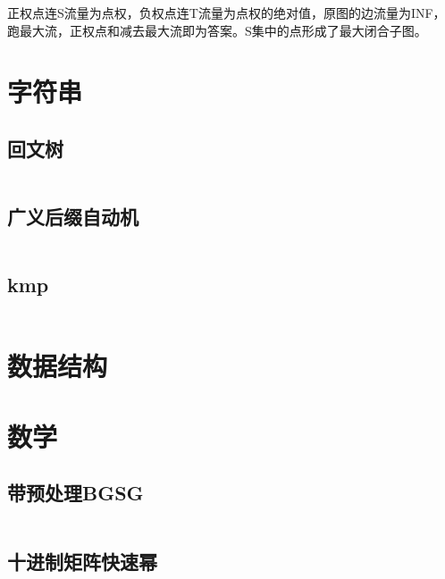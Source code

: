 \documentclass[a4paper,11pt]{article}
\begin{document}
	正权点连S流量为点权，负权点连T流量为点权的绝对值，原图的边流量为INF，跑最大流，正权点和减去最大流即为答案。S集中的点形成了最大闭合子图。






    \newpage
    \section{字符串}

    \subsection{回文树}
    \inputminted[breaklines]{c++}{String/pam.cpp}

    \subsection{广义后缀自动机}
    \inputminted[breaklines]{c++}{String/sam.cpp}

    \subsection{kmp}
    \inputminted[breaklines]{c++}{String/kmp.cpp}


    \newpage
    \section{数据结构}











    \newpage
    \section{数学} %

    \subsection{带预处理BGSG}
    \inputminted[breaklines]{c++}{Math/BGSG.cpp}

    \subsection{十进制矩阵快速幂}
    \inputminted[breaklines]{c++}{Math/快速幂.cpp}
\end{document}
